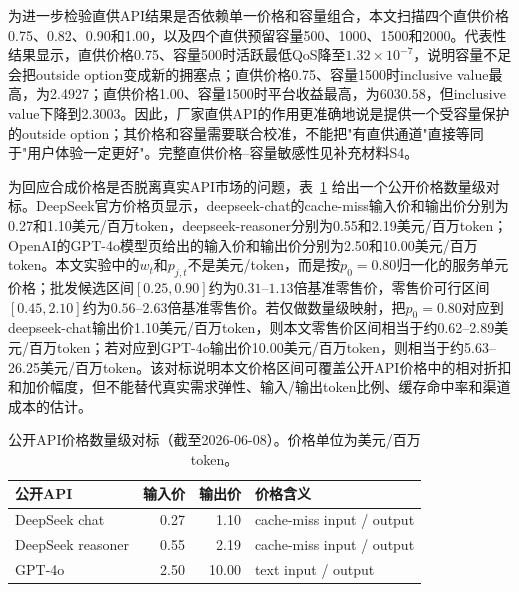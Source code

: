 \documentclass[UTF8,11pt]{ctexart}
\begin{document}
\begin{table}[H]
\centering
\caption{厂家直供API作为用户选择选项的实验结果}
\label{tab:direct_api_choice}
\small
{}
\end{table}

为进一步检验直供API结果是否依赖单一价格和容量组合，本文扫描四个直供价格0.75、0.82、0.90和1.00，以及四个直供预留容量500、1000、1500和2000。代表性结果显示，直供价格0.75、容量500时活跃最低QoS降至$1.32\times10^{-7}$，说明容量不足会把outside option变成新的拥塞点；直供价格0.75、容量1500时inclusive value最高，为2.4927；直供价格1.00、容量1500时平台收益最高，为6030.58，但inclusive value下降到2.3003。因此，厂家直供API的作用更准确地说是提供一个受容量保护的outside option；其价格和容量需要联合校准，不能把"有直供通道"直接等同于"用户体验一定更好"。完整直供价格--容量敏感性见补充材料S4。

为回应合成价格是否脱离真实API市场的问题，表~\ref{tab:public_api_price_check} 给出一个公开价格数量级对标。DeepSeek官方价格页显示，deepseek-chat的cache-miss输入价和输出价分别为0.27和1.10美元/百万token，deepseek-reasoner分别为0.55和2.19美元/百万token；OpenAI的GPT-4o模型页给出的输入价和输出价分别为2.50和10.00美元/百万token\cite{deepseekPricing2026,openaiGpt4oPricing2026}。本文实验中的$w_t$和$p_{j,t}$不是美元/token，而是按$p_0=0.80$归一化的服务单元价格；批发候选区间$[0.25,0.90]$约为$0.31$--$1.13$倍基准零售价，零售价可行区间$[0.45,2.10]$约为$0.56$--$2.63$倍基准零售价。若仅做数量级映射，把$p_0=0.80$对应到deepseek-chat输出价1.10美元/百万token，则本文零售价区间相当于约0.62--2.89美元/百万token；若对应到GPT-4o输出价10.00美元/百万token，则相当于约5.63--26.25美元/百万token。该对标说明本文价格区间可覆盖公开API价格中的相对折扣和加价幅度，但不能替代真实需求弹性、输入/输出token比例、缓存命中率和渠道成本的估计。

\begin{table}[H]
\centering
\caption{公开API价格数量级对标（截至2026-06-08）。价格单位为美元/百万token。}
\label{tab:public_api_price_check}
\small
\begin{tabular}{lrrl}
\toprule
公开API & 输入价 & 输出价 & 价格含义 \\
\midrule
DeepSeek chat & 0.27 & 1.10 & cache-miss input / output \\
DeepSeek reasoner & 0.55 & 2.19 & cache-miss input / output \\
GPT-4o & 2.50 & 10.00 & text input / output \\
\bottomrule
\end{tabular}
\end{table}
\end{document}
